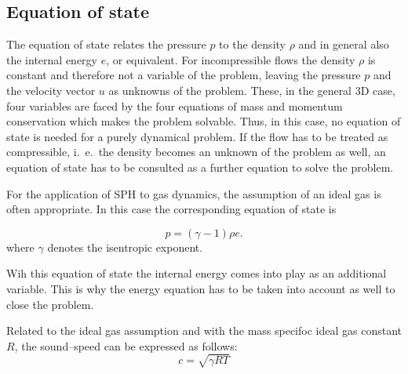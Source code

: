 \documentclass{report}
\begin{document}


\subsection{Equation of state}

The equation of state relates the pressure $p$ 
to the density $\rho$ and in general also the internal energy $e$, or equivalent.
For incompressible flows the density $\rho$ is constant and therefore not a variable of the problem, leaving the pressure $p$ and the velocity vector $u$ as unknowns of the problem. These, in the general 3D case, four variables are faced by the four equations of mass and momentum conservation which makes the problem solvable. Thus, in this case,  no equation of state is needed for a purely dynamical problem. If the flow has to be treated as compressible, i.\ e.\ the density becomes an unknown of the problem as well, an equation of state has to be consulted as a further equation to solve the problem.  

For the application of SPH to gas dynamics, the assumption of an ideal gas is often appropriate.
In this case the corresponding equation of state is

\begin{equation}
\label{eq:idealGasEqState}
 p=(\gamma-1)\rho e.
\end{equation}
where $\gamma$ denotes the isentropic exponent.

Wih this equation of state the internal energy comes into play as an additional variable. This is why the energy equation has to be taken into account as well to close the problem.

Related to the ideal gas assumption and with the mass specifoc ideal gas constant $R$, the sound--speed can be expressed as follows:
\begin{equation}
\label{eq:soundSpeed}
 c=\sqrt{\gamma R T}
\end{equation}
\end{document}
